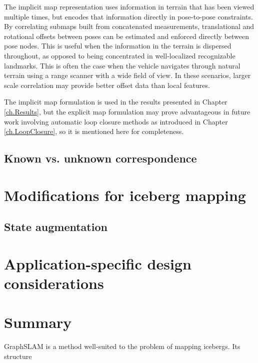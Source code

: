 The implicit map representation uses information in terrain that has been viewed multiple times, but encodes that information directly in pose-to-pose constraints. By correlating submaps built from concatenated measurements, translational and rotational offsets between poses can be estimated and enforced directly between pose nodes. This is useful when the information in the terrain is dispersed throughout, as opposed to being concentrated in well-localized recognizable landmarks. This is often the case when the vehicle navigates through natural terrain using a range scanner with a wide field of view. In these scenarios, larger scale correlation may provide better offset data than local features. 

The implicit map formulation is used in the results presented in Chapter \ref{ch.Results}, but the explicit map formulation may prove advantageous in future work involving automatic loop closure methods as introduced in Chapter \ref{ch.LoopClosure}, so it is mentioned here for completeness.

\subsection{Known vs. unknown correspondence}

\section{Modifications for iceberg mapping}

\subsection{State augmentation}

\section{Application-specific design considerations}

\section{Summary}

GraphSLAM is a method well-suited to the problem of mapping icebergs. Its structure 
